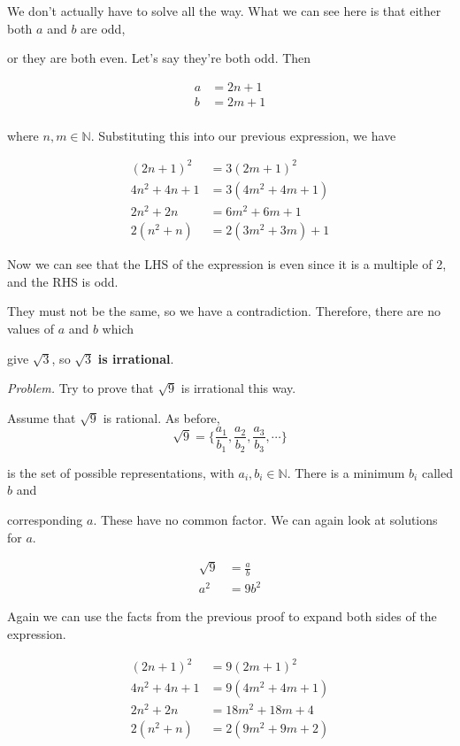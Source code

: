 \documentclass{article}
\begin{document}
We don't actually have to solve all the way. What we can see here is that either both $a$ and $b$ are odd, 

or they are both even. Let's say they're both odd. Then

\begin{align*}
a &= 2n + 1 \\
b &= 2m + 1 \\
\end{align*}

where $n, m \in \mathbb{N}$. Substituting this into our previous expression, we have

\begin{align*}
(2n+1)^2 &= 3(2m+1)^2 \\
4n^2 + 4n + 1 &= 3(4m^2 + 4m + 1) \\
2n^2 + 2n &= 6m^2 + 6m + 1 \\
2(n^2 + n) &= 2(3m^2 + 3m) +1
\end{align*}

Now we can see that the LHS of the expression is even since it is a multiple of 2, and the RHS is odd. 

They must not be the same, so we have a contradiction. Therefore, there are no values of $a$ and $b$ which 

give $\sqrt{3}$,  so $\sqrt{3}$ \textbf{is irrational}.


\bigskip

\noindent\textit{Problem.} Try to prove that $\sqrt{9}$ is irrational this way.

Assume that $\sqrt{9}$ is rational. As before, $$\sqrt{9} = \Big\{ \frac{a_1}{b_1}, \frac{a_2}{b_2}, \frac{a_3}{b_3}, \cdots \Big\}$$

is the set of possible representations, with $a_i, b_i \in \mathbb{N}.$ There is a minimum $b_i$ called $b$ and 

corresponding $a$. These have no common factor. We can again look at solutions for $a$.

\begin{align*}
\sqrt{9} &= \frac{a}{b} \\ 
a^2 &= 9b^2
\end{align*}

Again we can use the facts from the previous proof to expand both sides of the expression.

\begin{align*}
(2n+1)^2 &= 9(2m+1)^2 \\
4n^2 + 4n + 1 &= 9(4m^2 + 4m + 1) \\ %
2n^2 + 2n &= 18m^2 + 18m + 4 \\
2(n^2 + n) &= 2(9m^2 + 9m + 2)
\end{align*}
\end{document}
